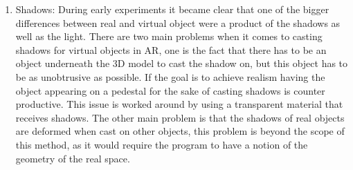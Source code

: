 \begin{enumerate}
 \item Shadows: During early experiments it became clear that one of the bigger differences between real and virtual object were a product of the shadows as well as the light. There are two main problems when it comes to casting shadows for virtual objects in AR, one is the fact that there has to be an object underneath the 3D model to cast the shadow on, but this object has to be as unobtrusive as possible. If the goal is to achieve realism having the object appearing on a pedestal for the sake of casting shadows is counter productive. This issue is worked around by using a transparent material that receives shadows. The other main problem is that the shadows of real objects are deformed when cast on other objects, this problem is beyond the scope of this method, as it would require the program to have a notion of the geometry of the real space. 
 
\end{enumerate}